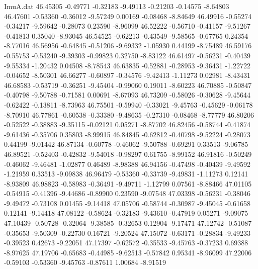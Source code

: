 \begin{filecontents}{ImuA.dat}
  46.45305   -0.49771   -0.32183   -9.49113   -0.21203   -0.14575   -8.64803
  46.47601   -0.53360   -0.36012   -9.57249    0.00169   -0.08468   -8.84649
  46.49916   -0.55274   -0.34217   -9.59642   -0.28073    0.23590   -8.96099
  46.52222   -0.56710   -0.41157   -9.51267   -0.41813    0.35040   -8.93045
  46.54525   -0.62213   -0.43549   -9.58565   -0.67765    0.24354   -8.77016
  46.56956   -0.64845   -0.51206   -9.69332   -1.05930    0.44199   -8.75489
  46.59176   -0.55753   -0.53240   -9.39303   -0.99823    0.32750   -8.83122
  46.61497   -0.56231   -0.40439   -9.55334   -1.20432    0.04508   -8.78543
  46.63835   -0.52881   -0.28953   -9.36431   -1.22722   -0.04652   -8.50301
  46.66277   -0.60897   -0.34576   -9.42413   -1.11273    0.02981   -8.43431
  46.68583   -0.53719   -0.36251   -9.45404   -0.99060    0.19011   -8.60223
  46.70885   -0.50847   -0.40798   -9.50788   -0.71581    0.00691   -8.67093
  46.73209   -0.58026   -0.30628   -9.45644   -0.62422   -0.13811   -8.73963
  46.75501   -0.59940   -0.33021   -9.45763   -0.45629   -0.06178   -8.70910
  46.77861   -0.60538   -0.33380   -9.48635   -0.27310   -0.08468   -8.77779
  46.80206   -0.52522   -0.38883   -9.35115   -0.02121    0.05271   -8.87702
  46.82456   -0.58744   -0.41874   -9.61436   -0.35706    0.35803   -8.99915
  46.84845   -0.62812   -0.40798   -9.52224   -0.28073    0.44199   -9.01442
  46.87134   -0.60778   -0.46062   -9.50788   -0.69291    0.33513   -9.06785
  46.89521   -0.52403   -0.42832   -9.54018   -0.98297    0.61755   -8.99152
  46.91816   -0.50249   -0.46062   -9.46481   -1.02877    0.46489   -8.98388
  46.94156   -0.47498   -0.40439   -9.49592   -1.21959    0.33513   -9.09838
  46.96479   -0.53360   -0.33739   -9.49831   -1.11273    0.12141   -8.93809
  46.98823   -0.58983   -0.36491   -9.49711   -1.12799    0.07561   -8.88466
  47.01105   -0.54915   -0.41396   -9.44686   -0.89900    0.23590   -9.07548
  47.03398   -0.56231   -0.38046   -9.49472   -0.73108    0.01455   -9.14418
  47.05706   -0.58744   -0.30987   -9.45045   -0.61658    0.12141   -9.14418
  47.08122   -0.58624   -0.32183   -9.43610   -0.47919    0.05271   -9.09075
  47.10439   -0.50728   -0.32064   -9.38585   -0.32653    0.12904   -9.17471
  47.12742   -0.51087   -0.35653   -9.50309   -0.22730    0.16721   -9.20524
  47.15072   -0.63171   -0.28834   -9.49233   -0.39523    0.42673   -9.22051
  47.17397   -0.62572   -0.35533   -9.45763   -0.37233    0.69388   -8.97625
  47.19706   -0.65683   -0.44985   -9.62513   -0.57842    0.95341   -8.96099
  47.22006   -0.59103   -0.53360   -9.45763   -0.87611    1.00684   -8.91519

\end{filecontents}
